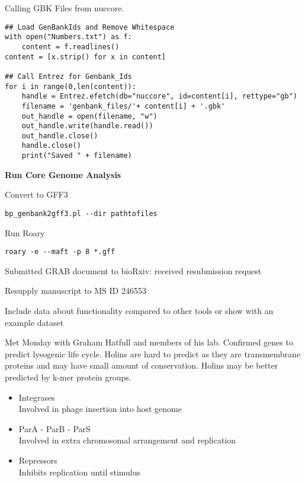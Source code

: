 \documentclass[idxtotoc,hyperref,openany,oneside]{labbook} %
\begin{document}
Calling GBK Files from nuccore. 

\begin{lstlisting}
## Load GenBankIds and Remove Whitespace
with open("Numbers.txt") as f:
    content = f.readlines()
content = [x.strip() for x in content]

## Call Entrez for Genbank_Ids
for i in range(0,len(content)):
    handle = Entrez.efetch(db="nuccore", id=content[i], rettype="gb")
    filename = 'genbank_files/'+ content[i] + '.gbk'
    out_handle = open(filename, "w")
    out_handle.write(handle.read())
    out_handle.close()
    handle.close()
    print("Saved " + filename)
\end{lstlisting} 

\textbf{Run Core Genome Analysis}

\vspace{0.3cm}

Convert to GFF3

\begin{verbatim}
bp_genbank2gff3.pl --dir pathtofiles
\end{verbatim}


Run Roary

\begin{verbatim}
roary -e --maft -p 8 *.gff
\end{verbatim}






Submitted GRAB document to bioRxiv: received resubmission request

Resupply manuscript to MS ID 246553

Include data about functionality compared to other tools or show with an example dataset





Met Monday with Graham Hatfull and members of his lab. Confirmed genes to predict lysogenic life cycle. Holins are hard to predict as they are transmembrane proteins and may have small amount of conservation. Holins may be better predicted by k-mer protein groups. 

\begin{itemize}
\item Integrases \\
Involved in phage insertion into host genome
\item ParA - ParB - ParS \\
Involved in extra chromosomal arrangement and replication
\item Repressors \\
Inhibits replication until stimulus 
\end{itemize}
\end{document}
